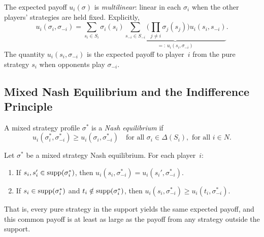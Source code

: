 \documentclass[11pt,a4paper]{article}
\begin{document}
\begin{remark}[Multilinearity]
\label{rem:multilinear}
The expected payoff $u_i(\sigma)$ is \emph{multilinear}: linear in each
$\sigma_i$ when the other players' strategies are held fixed. Explicitly,
\[
    u_i(\sigma_i, \sigma_{-i}) = \sum_{s_i \in S_i} \sigma_i(s_i)
    \underbrace{\sum_{s_{-i} \in S_{-i}}
    \bigg(\prod_{j \neq i} \sigma_j(s_j)\bigg) u_i(s_i, s_{-i})}_{
    =:\, u_i(s_i, \sigma_{-i})}.
\]
The quantity $u_i(s_i, \sigma_{-i})$ is the expected payoff to player~$i$
from the pure strategy $s_i$ when opponents play $\sigma_{-i}$.
\end{remark}

\subsection{Mixed Nash Equilibrium and the Indifference Principle}
\label{subsec:mixed_ne}

\begin{definition}
\label{def:mixed_ne}
A mixed strategy profile $\sigma^*$ is a \emph{Nash equilibrium} if
\[
    u_i(\sigma_i^*, \sigma_{-i}^*) \geq u_i(\sigma_i, \sigma_{-i}^*)
    \quad \text{for all } \sigma_i \in \Delta(S_i), \text{ for all } i \in N.
\]
\end{definition}

\begin{keyresult}
\begin{theorem}
\label{thm:indifference}
Let $\sigma^*$ be a mixed strategy Nash equilibrium. For each player~$i$:
\begin{enumerate}[nosep,label=(\alph*)]
    \item If $s_i, s_i' \in \operatorname{supp}(\sigma_i^*)$, then
    $u_i(s_i, \sigma_{-i}^*) = u_i(s_i', \sigma_{-i}^*)$.
    \item If $s_i \in \operatorname{supp}(\sigma_i^*)$ and $t_i \notin \operatorname{supp}(\sigma_i^*)$,
    then $u_i(s_i, \sigma_{-i}^*) \geq u_i(t_i, \sigma_{-i}^*)$.
\end{enumerate}
That is, every pure strategy in the support yields the same expected payoff,
and this common payoff is at least as large as the payoff from any
strategy outside the support.
\end{theorem}
\end{keyresult}
\end{document}
